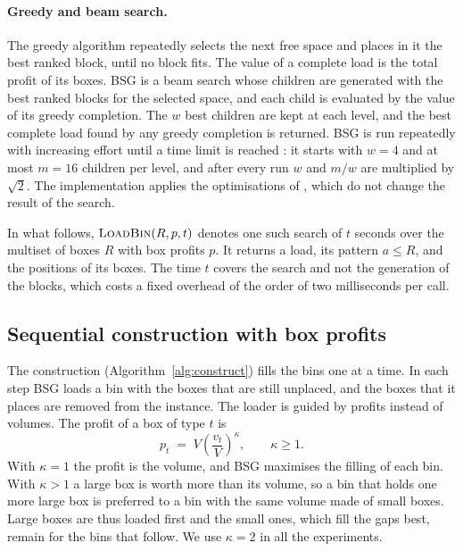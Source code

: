 \paragraph{Greedy and beam search.}
The greedy algorithm repeatedly selects the next free space and places in it the best ranked
block, until no block fits. The value of a complete load is the total profit of its boxes. BSG is
a beam search whose children are generated with the best ranked blocks for the selected space,
and each child is evaluated by the value of its greedy completion. The $w$ best children are kept
at each level, and the best complete load found by any greedy completion is returned. BSG is run
repeatedly with increasing effort until a time limit is reached \citep{Araya2017}: it starts with
$w=4$ and at most $m=16$ children per level, and after every run $w$ and $m/w$ are multiplied by
$\sqrt{2}$. The implementation applies the optimisations of \citet{Guesser2026}, which do not
change the result of the search.

In what follows, $\textsc{LoadBin}(R,p,t)$ denotes one such search of $t$ seconds over the multiset
of boxes $R$ with box profits $p$. It returns a load, its pattern $a\le R$, and the positions of
its boxes. The time $t$ covers the search and not the generation of the blocks, which costs a
fixed overhead of the order of two milliseconds per call.

\subsection{Sequential construction with box profits}
\label{sec:m-construct}

The construction (Algorithm~\ref{alg:construct}) fills the bins one at a time. In each step
BSG loads a bin with the boxes that are still unplaced, and the boxes that it places are removed
from the instance. The loader is guided by profits instead of volumes. The profit of a box of
type $t$ is
\begin{equation}
\label{eq:profit}
p_t \;=\; V\left(\frac{v_t}{V}\right)^{\kappa},\qquad \kappa\ge 1 .
\end{equation}
With $\kappa=1$ the profit is the volume, and BSG maximises the filling of each bin. With
$\kappa>1$ a large box is worth more than its volume, so a bin that holds one more large box is
preferred to a bin with the same volume made of small boxes. Large boxes are thus loaded first
and the small ones, which fill the gaps best, remain for the bins that follow. We use $\kappa=2$ in all the experiments.

